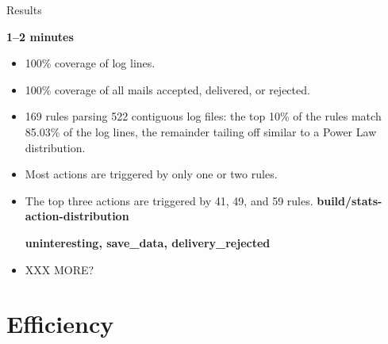 \documentclass{beamer}
\newcommand{\timingnote}[1]{%
    \textbf{#1}%
}
\begin{document}
\begin{frame}{Results}

    \timingnote{1--2 minutes}

    \begin{itemize}

        \item 100\% coverage of log lines.

        \item 100\% coverage of all mails accepted, delivered, or rejected.

        \item 169 rules parsing 522 contiguous log files: the top 10\% of
            the rules match 85.03\% of the log lines, the remainder tailing
            off similar to a Power Law distribution.

        \item Most actions are triggered by only one or two rules.

        \item The top three actions are triggered by 41, 49, and 59 rules.
            \timingnote{build/stats-action-distribution}
            \timingnote{uninteresting, save\_data, delivery\_rejected}

        \item XXX MORE\@?

    \end{itemize}

\end{frame}

\section{Efficiency}
\end{document}
